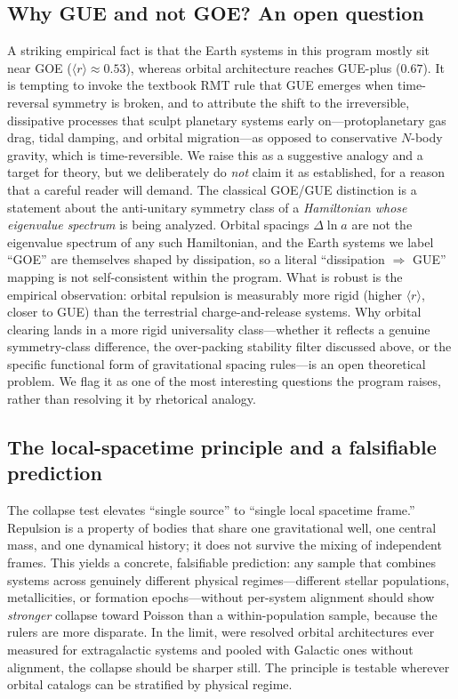 \documentclass[12pt,a4paper]{article}
\begin{document}
\subsection{Why GUE and not GOE? An open question}

A striking empirical fact is that the Earth systems in this program mostly sit near GOE ($\langle r\rangle\approx0.53$), whereas orbital architecture reaches GUE-plus ($0.67$). It is tempting to invoke the textbook RMT rule that GUE emerges when time-reversal symmetry is broken, and to attribute the shift to the irreversible, dissipative processes that sculpt planetary systems early on---protoplanetary gas drag, tidal damping, and orbital migration---as opposed to conservative $N$-body gravity, which is time-reversible. We raise this as a suggestive analogy and a target for theory, but we deliberately do \emph{not} claim it as established, for a reason that a careful reader will demand. The classical GOE/GUE distinction is a statement about the anti-unitary symmetry class of a \emph{Hamiltonian whose eigenvalue spectrum} is being analyzed. Orbital spacings $\Delta\ln a$ are not the eigenvalue spectrum of any such Hamiltonian, and the Earth systems we label ``GOE'' are themselves shaped by dissipation, so a literal ``dissipation $\Rightarrow$ GUE'' mapping is not self-consistent within the program. What is robust is the empirical observation: orbital repulsion is measurably more rigid (higher $\langle r\rangle$, closer to GUE) than the terrestrial charge-and-release systems. Why orbital clearing lands in a more rigid universality class---whether it reflects a genuine symmetry-class difference, the over-packing stability filter discussed above, or the specific functional form of gravitational spacing rules---is an open theoretical problem. We flag it as one of the most interesting questions the program raises, rather than resolving it by rhetorical analogy.

\subsection{The local-spacetime principle and a falsifiable prediction}

The collapse test elevates ``single source'' to ``single local spacetime frame.'' Repulsion is a property of bodies that share one gravitational well, one central mass, and one dynamical history; it does not survive the mixing of independent frames. This yields a concrete, falsifiable prediction: any sample that combines systems across genuinely different physical regimes---different stellar populations, metallicities, or formation epochs---without per-system alignment should show \emph{stronger} collapse toward Poisson than a within-population sample, because the rulers are more disparate. In the limit, were resolved orbital architectures ever measured for extragalactic systems and pooled with Galactic ones without alignment, the collapse should be sharper still. The principle is testable wherever orbital catalogs can be stratified by physical regime.
\end{document}
